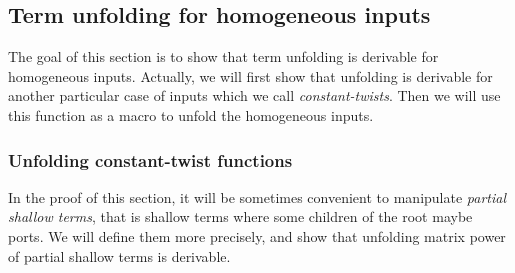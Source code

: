 
\subsection{Term unfolding for homogeneous inputs}
\label{sec:homo-unfold}

The goal of this section is to show that term unfolding is derivable for homogeneous inputs. Actually, we will first show that unfolding is derivable for another particular case of inputs which we call \emph{constant-twists}. Then we will use this function as a macro to unfold the homogeneous inputs.  

\subsubsection{Unfolding constant-twist functions}

In the proof of this section, it will be sometimes convenient to manipulate \emph{partial shallow terms}, that is shallow terms where some children of the root maybe ports. We will define them more precisely, and show that unfolding matrix power of partial shallow terms is derivable.  

